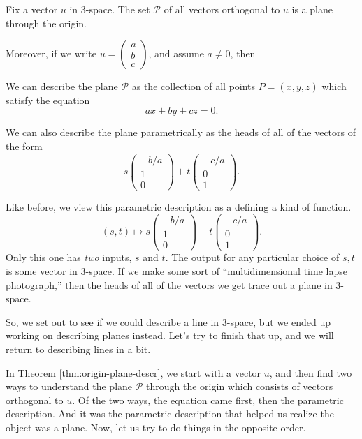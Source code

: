\documentclass[00-livre-main.tex]{subfiles}
\begin{document}
\begin{theorem}\label{thm:origin-plane-descr}
Fix a vector $u$ in $3$-space. The set $\mathcal{P}$ of all vectors orthogonal to $u$ is a plane through the origin. 

Moreover, if we write $u = \left( \begin{smallmatrix} a\\ b \\ c \end{smallmatrix}\right)$, and assume $a\neq 0$, then
\begin{compactitem}
\item We can describe the plane $\mathcal{P}$ as the collection of all points $P = (x,y,z)$ which satisfy the equation
\[
ax + by  +cz = 0.
\]
\item We can also describe the plane parametrically as the heads of all of the vectors of the form
\[
s \begin{pmatrix} -b/a \\ 1 \\ 0\end{pmatrix} 
+ t \begin{pmatrix} -c/a\\ 0 \\ 1 \end{pmatrix} .
\]
\end{compactitem}
\end{theorem}

Like before, we view this parametric description as a defining a kind of function. 
\[
(s,t) \mapsto s \begin{pmatrix} -b/a \\ 1 \\ 0\end{pmatrix} 
+ t \begin{pmatrix} -c/a\\ 0 \\ 1 \end{pmatrix} .
\]
Only this one has \emph{two} inputs, $s$ and $t$. The output for any particular choice of $s,t$ is some vector in $3$-space. If we make some sort of ``multidimensional time lapse photograph,'' then the heads of all of the vectors we get trace out a plane in $3$-space.


So, we set out to see if we could describe a line in $3$-space, but we ended up working on describing planes instead. Let's try to finish that up, and we will return to describing lines in a bit.

In Theorem \ref{thm:origin-plane-descr}, we start with a vector $u$, and then find two ways to understand the plane $\mathcal{P}$ through the origin which consists of vectors orthogonal to $u$. Of the two ways, the equation came first, then the parametric description. And it was the parametric description that helped us realize the object was a plane. 
Now, let us try to do things in the opposite order. 
\end{document}
